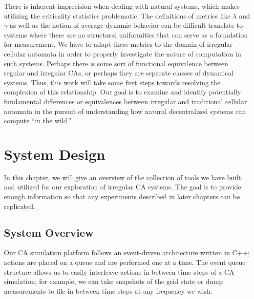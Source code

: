 \documentclass[a4paper,11pt]{report}
\begin{document}
There is inherent imprecision when dealing with natural systems, which makes utilizing the criticality statistics problematic. The definitions of metrics like $\lambda$ and $\gamma$ as well as the notion of average dynamic behavior can be difficult translate to systems where there are no structural uniformities that can serve as a foundation for measurement. We have to adapt these metrics to the domain of irregular cellular automata in order to properly investigate the nature of computation in such systems. Perhaps there is some sort of functional equivalence between regular and irregular CAs, or perhaps they are separate classes of dynamical systems. Thus, this work will take some first steps towards resolving the complexion of this relationship. Our goal is to examine and identify potentially fundamental differences or equivalences between irregular and traditional cellular automata in the pursuit of understanding how natural decentralized systems can compute ``in the wild.''




\processdelayedfloats

\chapter{System Design}
\label{ch:System}

In this chapter, we will give an overview of the collection of tools we have built and utilized for our exploration of irregular CA systems. The goal is to provide enough information so that any experiments described in later chapters can be replicated. 

\section{System Overview}
\label{sec:SysOverview}

Our CA simulation platform follows an event-driven architecture written in C++; actions are placed on a queue and are performed one at a time. The event queue structure allows us to easily interleave actions in between time steps of a CA simulation; for example, we can take snapshots of the grid state or dump measurements to file in between time steps at any frequency we wish.
\end{document}
